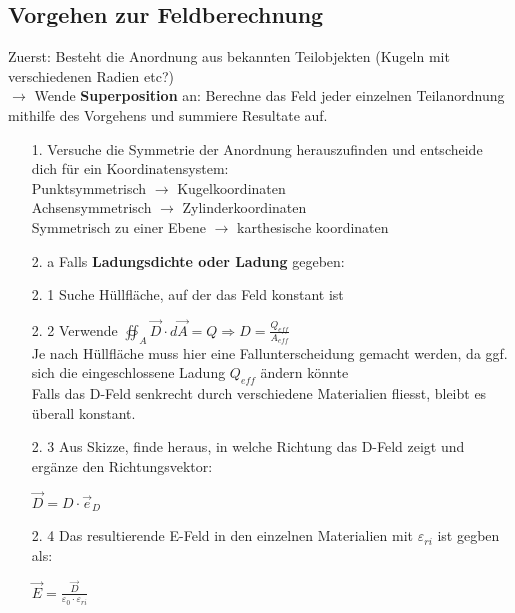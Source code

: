 \subsection{Vorgehen zur Feldberechnung}
\beginvor
Zuerst: Besteht die Anordnung aus bekannten Teilobjekten (Kugeln mit verschiedenen Radien etc?) \\
$\rightarrow$ Wende \textbf{Superposition} an: Berechne das Feld jeder einzelnen Teilanordnung mithilfe des Vorgehens und summiere Resultate auf.
\\
\begin{itemize}

	\item [1. ] Versuche die Symmetrie der Anordnung herauszufinden und entscheide dich für ein Koordinatensystem: \\
	Punktsymmetrisch $\rightarrow$ Kugelkoordinaten \\
	Achsensymmetrisch $\rightarrow$ Zylinderkoordinaten \\
	Symmetrisch zu einer Ebene $\rightarrow$ karthesische koordinaten\\

	\item [2. a]Falls \textbf{Ladungsdichte oder Ladung} gegeben: \\
\end{itemize}
	\beginip
	\begin{itemize}

	\item [2. 1]  Suche Hüllfläche, auf der das Feld konstant ist


	\item [2. 2] Verwende $\displaystyle \oiint_A \vec{D} \cdot d\vec{A} = Q \Rightarrow D = \frac{Q_{eff}}{A_{eff}}$ \\
	Je nach Hüllfläche muss hier eine Fallunterscheidung gemacht werden, da ggf. sich die eingeschlossene Ladung $Q_{eff}$ ändern könnte\\
	Falls das D-Feld senkrecht durch verschiedene Materialien fliesst, bleibt es überall konstant.

	\item [2. 3] Aus Skizze, finde heraus, in welche Richtung das D-Feld zeigt und ergänze den Richtungsvektor:
	\begin{center}
		$\vec{D} = D \cdot \vec{e}_D$
	\end{center}

	\item [2. 4] Das resultierende E-Feld in den einzelnen Materialien mit $\varepsilon_{ri}$ ist gegben als:
	\begin{center}
			$\displaystyle \vec{E} = \frac{\vec{D}}{\varepsilon_0 \cdot \varepsilon_{ri}}$
	\end{center}
\end{itemize}
